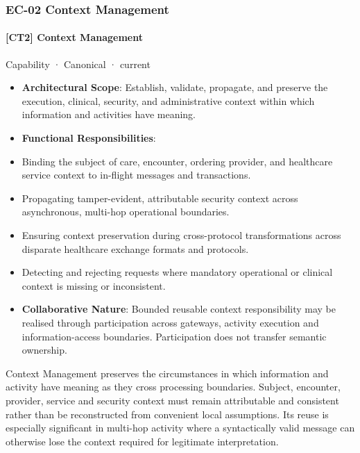 \subsubsection{EC-02 Context Management}

\paragraph{[CT2] Context Management}

\label{element:3cfd3e56c23a4943bd1b476ec248ac49}
{\small Capability · Canonical · current}\par

\begin{itemize}


\item \textbf{Architectural Scope}: Establish, validate, propagate, and preserve the execution, clinical, security, and administrative context within which information and activities have meaning.

\item \textbf{Functional Responsibilities}:

\item Binding the subject of care, encounter, ordering provider, and healthcare service context to in-flight messages and transactions.

\item Propagating tamper-evident, attributable security context across asynchronous, multi-hop operational boundaries.

\item Ensuring context preservation during cross-protocol transformations across disparate healthcare exchange formats and protocols.

\item Detecting and rejecting requests where mandatory operational or clinical context is missing or inconsistent.

\item \textbf{Collaborative Nature}: Bounded reusable context responsibility may be realised through participation across gateways, activity execution and information-access boundaries. Participation does not transfer semantic ownership.

\end{itemize}


Context Management preserves the circumstances in which information and activity have meaning as they cross processing boundaries. Subject, encounter, provider, service and security context must remain attributable and consistent rather than be reconstructed from convenient local assumptions. Its reuse is especially significant in multi-hop activity where a syntactically valid message can otherwise lose the context required for legitimate interpretation.




